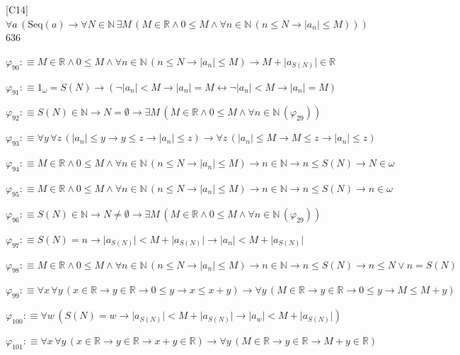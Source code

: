 \begin{fullproof}{[C14]}{$\forall a\,(\mathrm{Seq}(a) \to \forall N \in \mathbb{N}\,\exists M\,(M \in \mathbb{R} \land 0 \leq M \land \forall n \in \mathbb{N}\,(n \leq N \to \lvert a_{n} \rvert \leq M)))$}{636}
\begin{abbrevlist}
\item $\varphi_{90} :\equiv M \in \mathbb{R} \land 0 \leq M \land \forall n \in \mathbb{N}\,(n \leq N \to \lvert a_{n} \rvert \leq M) \to M + \lvert a_{S(N)} \rvert \in \mathbb{R}$
\item $\varphi_{91} :\equiv 1_{\omega} = S(N) \to (\neg \lvert a_{n} \rvert < M \to \lvert a_{n} \rvert = M \leftrightarrow \neg \lvert a_{n} \rvert < M \to \lvert a_{n} \rvert = M)$
\item $\varphi_{92} :\equiv S(N) \in \mathbb{N} \to N = \emptyset \to \exists M\,(M \in \mathbb{R} \land 0 \leq M \land \forall n \in \mathbb{N}\,(\varphi_{29}))$
\item $\varphi_{93} :\equiv \forall y\,\forall z\,(\lvert a_{n} \rvert \leq y \to y \leq z \to \lvert a_{n} \rvert \leq z) \to \forall z\,(\lvert a_{n} \rvert \leq M \to M \leq z \to \lvert a_{n} \rvert \leq z)$
\item $\varphi_{94} :\equiv M \in \mathbb{R} \land 0 \leq M \land \forall n \in \mathbb{N}\,(n \leq N \to \lvert a_{n} \rvert \leq M) \to n \in \mathbb{N} \to n \leq S(N) \to N \in \omega$
\item $\varphi_{95} :\equiv M \in \mathbb{R} \land 0 \leq M \land \forall n \in \mathbb{N}\,(n \leq N \to \lvert a_{n} \rvert \leq M) \to n \in \mathbb{N} \to n \leq S(N) \to n \in \omega$
\item $\varphi_{96} :\equiv S(N) \in \mathbb{N} \to N \neq \emptyset \to \exists M\,(M \in \mathbb{R} \land 0 \leq M \land \forall n \in \mathbb{N}\,(\varphi_{29}))$
\item $\varphi_{97} :\equiv S(N) = n \to \lvert a_{S(N)} \rvert < M + \lvert a_{S(N)} \rvert \to \lvert a_{n} \rvert < M + \lvert a_{S(N)} \rvert$
\item $\varphi_{98} :\equiv M \in \mathbb{R} \land 0 \leq M \land \forall n \in \mathbb{N}\,(n \leq N \to \lvert a_{n} \rvert \leq M) \to n \in \mathbb{N} \to n \leq S(N) \to n \leq N \lor n = S(N)$
\item $\varphi_{99} :\equiv \forall x\,\forall y\,(x \in \mathbb{R} \to y \in \mathbb{R} \to 0 \leq y \to x \leq x + y) \to \forall y\,(M \in \mathbb{R} \to y \in \mathbb{R} \to 0 \leq y \to M \leq M + y)$
\item $\varphi_{100} :\equiv \forall w\,(S(N) = w \to \lvert a_{S(N)} \rvert < M + \lvert a_{S(N)} \rvert \to \lvert a_{w} \rvert < M + \lvert a_{S(N)} \rvert)$
\item $\varphi_{101} :\equiv \forall x\,\forall y\,(x \in \mathbb{R} \to y \in \mathbb{R} \to x + y \in \mathbb{R}) \to \forall y\,(M \in \mathbb{R} \to y \in \mathbb{R} \to M + y \in \mathbb{R})$

\end{abbrevlist}
\end{fullproof}
